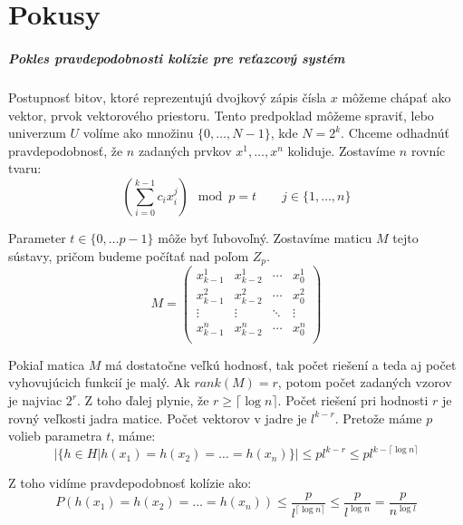 \chapter{Pokusy}
\paragraph{Pokles pravdepodobnosti kolízie pre reťazcový systém}

Postupnosť bitov, ktoré reprezentujú dvojkový zápis čísla $x$ môžeme chápať ako vektor, prvok vektorového priestoru. Tento predpoklad môžeme spraviť, lebo univerzum $U$ volíme ako množinu $\{0, \dots, N - 1 \}$, kde $N = 2^k$. Chceme odhadnúť pravdepodobnosť, že $n$ zadaných prvkov $x^1, \dots, x^n$ koliduje. Zostavíme $n$ rovníc tvaru:
\begin{displaymath}
\left(\displaystyle \sum_{i=0}^{k-1} c_i x_i^j\right) \mod p = t \qquad j \in \{1, \dots, n\}
\end{displaymath}

Parameter $t \in \{0, \dots p-1\}$ môže byť ľubovoľný. Zostavíme maticu $M$ tejto sústavy, pričom budeme počítať nad poľom $Z_p$. 
\begin{displaymath}
M = \begin{pmatrix}
  x_{k-1}^1 & x_{k-2}^1 & \cdots & x_0^1  \\
  x_{k-1}^2 & x_{k-2}^2 & \cdots & x_0^2  \\
  \vdots  	& \vdots  	& \ddots & \vdots \\
  x_{k-1}^n & x_{k-2}^n & \cdots & x_0^n  \\
 \end{pmatrix}
\end{displaymath}

Pokiaľ matica $M$ má dostatočne veľkú hodnosť, tak počet riešení a teda aj počet vyhovujúcich funkcií je malý. Ak $rank(M) = r$, potom počet zadaných vzorov je najviac $2^r$. Z toho ďalej plynie, že $r \geq \lceil \log n \rceil$. Počet riešení pri hodnosti $r$ je rovný veľkosti jadra matice. Počet vektorov v jadre je $l^{k-r}$. Pretože máme $p$ volieb parametra $t$, máme:
\begin{displaymath}
|\{ h \in H | h(x_1) = h(x_2) = \dots = h(x_n) \}| \leq p l^{k-r} \leq p l^{k - \lceil \log n \rceil}
\end{displaymath}

Z toho vidíme pravdepodobnosť kolízie ako:
\begin{displaymath}
P(h(x_1) = h(x_2) = \dots = h(x_n)) \leq \frac{p}{l^{\lceil \log n \rceil}} \leq \frac{p}{l^{\log n}} = \frac{p}{n^{\log l}}
\end{displaymath}

